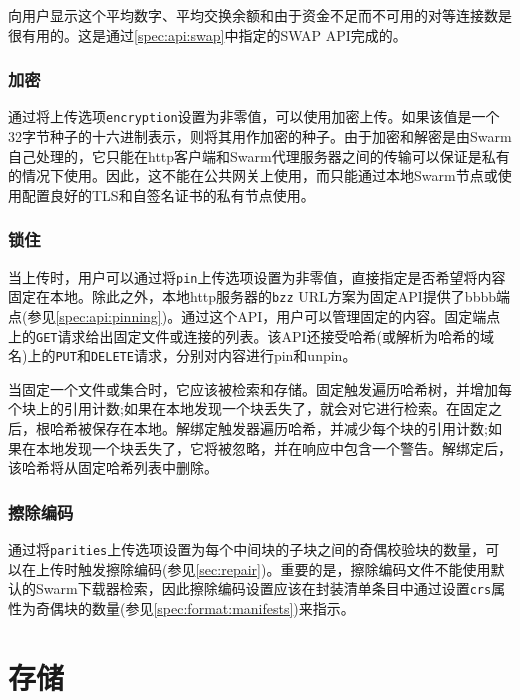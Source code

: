 向用户显示这个平均数字、平均交换余额和由于资金不足而不可用的对等连接数是很有用的。这是通过\ref{spec:api:swap}中指定的SWAP API完成的。

\subsubsection{加密}

通过将上传选项\lstinline{encryption}设置为非零值，可以使用加密上传。如果该值是一个32字节种子的十六进制表示，则将其用作加密的种子。由于加密和解密是由Swarm自己处理的，它只能在http客户端和Swarm代理服务器之间的传输可以保证是私有的情况下使用。因此，这不能在公共网关上使用，而只能通过本地Swarm节点或使用配置良好的TLS和自签名证书的私有节点使用。

\subsubsection{锁住}

当上传时，用户可以通过将\lstinline{pin}上传选项设置为非零值，直接指定是否希望将内容固定在本地。除此之外，本地http服务器的\lstinline{bzz} URL方案为固定API提供了bbbb端点(参见\ref{spec:api:pinning})。通过这个API，用户可以管理固定的内容。固定端点上的\lstinline{GET}请求给出固定文件或连接的列表。该API还接受哈希(或解析为哈希的域名)上的\lstinline{PUT}和\lstinline{DELETE}请求，分别对内容进行pin和unpin。

当固定一个文件或集合时，它应该被检索和存储。固定触发遍历哈希树，并增加每个块上的引用计数;如果在本地发现一个块丢失了，就会对它进行检索。在固定之后，根哈希被保存在本地。解绑定触发器遍历哈希，并减少每个块的引用计数;如果在本地发现一个块丢失了，它将被忽略，并在响应中包含一个警告。解绑定后，该哈希将从固定哈希列表中删除。 



\subsubsection{擦除编码}

通过将\lstinline{parities}上传选项设置为每个中间块的子块之间的奇偶校验块的数量，可以在上传时触发擦除编码(参见\ref{sec:repair})。重要的是，擦除编码文件不能使用默认的Swarm下载器检索，因此擦除编码设置应该在封装清单条目中通过设置\lstinline{crs}属性为奇偶块的数量(参见\ref{spec:format:manifests})来指示。 

\section{存储\statusgreen}\label{sec:storage-ux}

